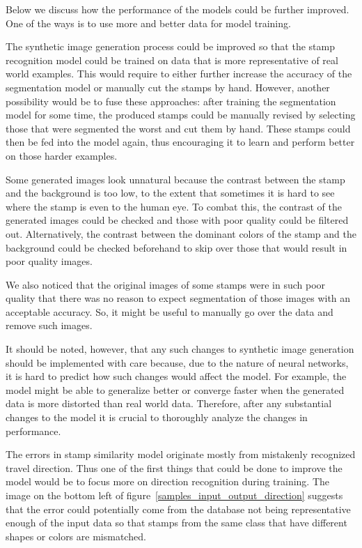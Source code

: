 \documentclass[twocolumn]{svjour3}
\begin{document}
Below we discuss how the performance of the models could be further improved. One of the ways is to use more and better data for model training.

The synthetic image generation process could be improved so that the stamp recognition model could be trained on data that is more representative of real world examples. This would require to either further increase the accuracy of the segmentation model or manually cut the stamps by hand. However, another possibility would be to fuse these approaches: after training the segmentation model for some time, the produced stamps could be manually revised by selecting those that were segmented the worst and cut them by hand. These stamps could then be fed into the model again, thus encouraging it to learn and perform better on those harder examples.

Some generated images look unnatural because the contrast between the stamp and the background is too low, to the extent that sometimes it is hard to see where the stamp is even to the human eye. To combat this, the contrast of the generated images could be checked and those with poor quality could be filtered out. Alternatively, the contrast between the dominant colors of the stamp and the background could be checked beforehand to skip over those that would result in poor quality images.

We also noticed that the original images of some stamps were in such poor quality that there was no reason to expect segmentation of those images with an acceptable accuracy. So, it might be useful to manually go over the data and remove such images.

It should be noted, however, that any such changes to synthetic image generation should be implemented with care because, due to the nature of neural networks, it is hard to predict how such changes would affect the model. For example, the model might be able to generalize better or converge faster when the generated data is more distorted than real world data. Therefore, after any substantial changes to the model it is crucial to thoroughly analyze the changes in performance.

The errors in stamp similarity model originate mostly from mistakenly recognized travel direction. Thus one of the first things that could be done to improve the model would be to focus more on direction recognition during training. The image on the bottom left of figure~\ref{samples_input_output_direction} suggests that the error could potentially come from the database not being representative enough of the input data so that stamps from the same class that have different shapes or colors are mismatched.
\end{document}
